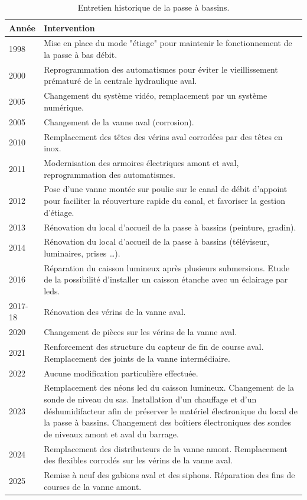 \documentclass[11pt,twocolumn,titlepage,twoside]{article}\usepackage[]{graphicx}\usepackage[]{xcolor}
\begin{document}
\begin{table}[htb]
\begin{tabular}{p{}p{}}
\toprule
Année & Intervention\\
\midrule
1998 & Mise en place du mode "étiage" pour maintenir le fonctionnement
de la passe à bas débit.\\
2000 & Reprogrammation des automatismes pour éviter le vieillissement
prématuré de la centrale hydraulique aval.\\
2005 & Changement du système vidéo, remplacement par un système
numérique. \\
2005 & Changement de la vanne aval (corrosion).\\
2010 & Remplacement des têtes des vérins aval corrodées par des têtes en
inox.\\
2011 & Modernisation des armoires électriques amont et aval,
reprogrammation des automatismes.\\
2012 & Pose d'une vanne montée sur poulie sur le canal de débit d'appoint
pour faciliter la réouverture rapide du canal, et favoriser la gestion
d'étiage.\\
2013 & Rénovation du local d'accueil de la passe à bassins (peinture,
gradin).\\
2014 & Rénovation du local d'accueil de la passe à bassins (téléviseur,
luminaires, prises \ldots{}).\\
2016 & Réparation du caisson lumineux après plusieurs submersions. Etude
de la possibilité d'installer un caisson étanche avec un éclairage par
leds.\\
2017-18 & Rénovation des vérins de la vanne aval.\\
2020 & Changement de pièces sur les vérins de la vanne aval.\\
2021 & Renforcement des structure du capteur de fin de course aval. Remplacement
des joints de la vanne intermédiaire.\\
2022 & Aucune modification particulière effectuée.\\
2023 & Remplacement des néons led du caisson lumineux. Changement de la sonde
de niveau du sas. Installation d’un chauffage et d’un déshumidifacteur afin de
préserver le matériel électronique du local de la passe à bassins. Changement
des boîtiers électroniques des sondes de niveaux amont et aval du barrage.\\
2024 & Remplacement des distributeurs de la vanne amont. Remplacement des
flexibles corrodés sur les vérins de la vanne aval.\\
2025 & Remise à neuf des gabions aval et des siphons. Réparation des fins
de courses de la vanne amont.\\
\bottomrule
\end{tabular}
\caption{Entretien historique de la passe à bassins.}
\label{table_entretien_passe}
\end{table}
\end{document}
